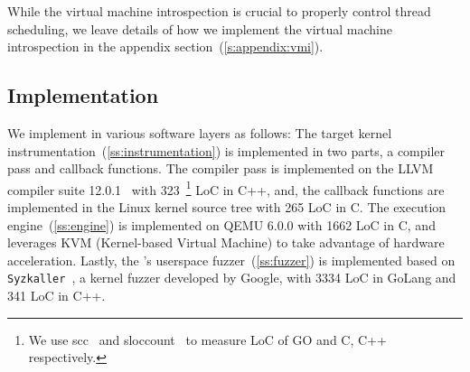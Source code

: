 While the virtual machine introspection is crucial to properly control
thread scheduling, we leave details of how we implement the virtual
machine introspection in the appendix
section~(\autoref{s:appendix:vmi}).




\subsection{Implementation}
\label{ss:impl}

We implement \sys in various software layers as follows:
%
The target kernel instrumentation~(\autoref{ss:instrumentation}) is
implemented in two parts, a compiler pass and callback functions. The
compiler pass is implemented on the LLVM compiler suite
12.0.1~\cite{llvm} with 323~\footnote{We use scc~\cite{scc} and
  sloccount~\cite{sloccount} to measure LoC of GO and C, C++
  respectively.} LoC in C++, and, the callback functions are
implemented in the Linux kernel source tree with 265 LoC in C.
%
The execution engine~(\autoref{ss:engine}) is implemented on QEMU
6.0.0 with 1662 LoC in C, and leverages KVM (Kernel-based Virtual
Machine) to take advantage of hardware acceleration.
%
%
Lastly, the \sys's userspace fuzzer~(\autoref{ss:fuzzer}) is
implemented based on \texttt{Syzkaller}~\cite{syzkaller}, a kernel
fuzzer developed by Google, with 3334 LoC in GoLang and 341 LoC in C++.











